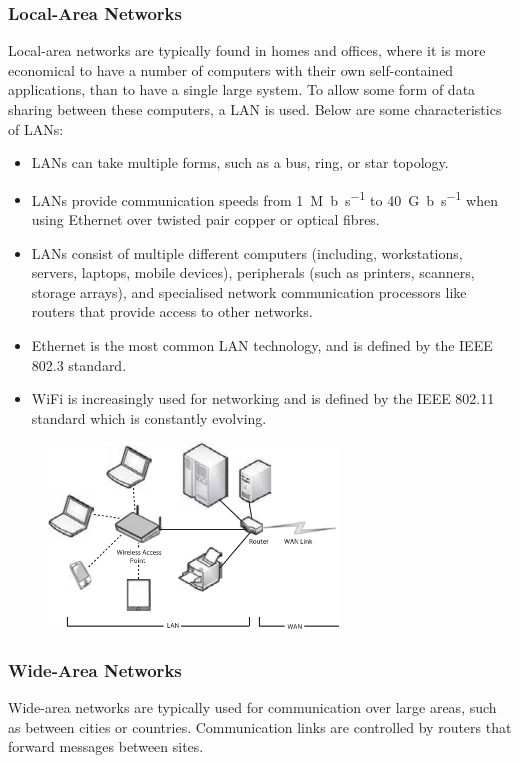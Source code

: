 \documentclass{article}
\begin{document}
\subsubsection{Local-Area Networks}
Local-area networks are typically found in homes and offices, where it
is more economical to have a number of computers with their own
self-contained applications, than to have a single large system. To
allow some form of data sharing between these computers, a LAN is used.
Below are some characteristics of LANs:
\begin{itemize}
    \item LANs can take multiple forms, such as a bus, ring, or star
          topology.
    \item LANs provide communication speeds from \qty{1}{M.b.s^{-1}} to
          \qty{40}{G.b.s^{-1}} when using Ethernet over twisted pair
          copper or optical fibres.
    \item LANs consist of multiple different computers (including,
          workstations, servers, laptops, mobile devices), peripherals
          (such as printers, scanners, storage arrays), and specialised
          network communication processors like routers that provide
          access to other networks.
    \item Ethernet is the most common LAN technology, and is defined by
          the IEEE 802.3 standard.
    \item WiFi is increasingly used for networking and is defined by
          the IEEE 802.11 standard which is constantly evolving.
\end{itemize}
\begin{figure}[H]
    \centering
    \includegraphics[height = 5cm]{figures/LAN.pdf}
\end{figure}
\subsubsection{Wide-Area Networks}
Wide-area networks are typically used for communication over large
areas, such as between cities or countries. Communication links are
controlled by routers that forward messages between sites.
\end{document}
